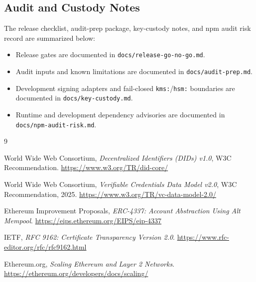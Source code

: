 \documentclass[11pt]{article}
\begin{document}
\subsection{Audit and Custody Notes}

The release checklist, audit-prep package, key-custody notes, and npm audit risk record are summarized below:

\begin{itemize}
    \item Release gates are documented in \texttt{docs/release-go-no-go.md}.
    \item Audit inputs and known limitations are documented in \texttt{docs/audit-prep.md}.
    \item Development signing adapters and fail-closed \texttt{kms:}/\texttt{hsm:} boundaries are documented in \texttt{docs/key-custody.md}.
    \item Runtime and development dependency advisories are documented in \texttt{docs/npm-audit-risk.md}.
\end{itemize}

\newpage
\begin{thebibliography}{9}

World Wide Web Consortium, \textit{Decentralized Identifiers (DIDs) v1.0}, W3C Recommendation. \url{https://www.w3.org/TR/did-core/}

World Wide Web Consortium, \textit{Verifiable Credentials Data Model v2.0}, W3C Recommendation, 2025. \url{https://www.w3.org/TR/vc-data-model-2.0/}

Ethereum Improvement Proposals, \textit{ERC-4337: Account Abstraction Using Alt Mempool}. \url{https://eips.ethereum.org/EIPS/eip-4337}

IETF, \textit{RFC 9162: Certificate Transparency Version 2.0}. \url{https://www.rfc-editor.org/rfc/rfc9162.html}

Ethereum.org, \textit{Scaling Ethereum and Layer 2 Networks}. \url{https://ethereum.org/developers/docs/scaling/}

\end{thebibliography}
\end{document}
